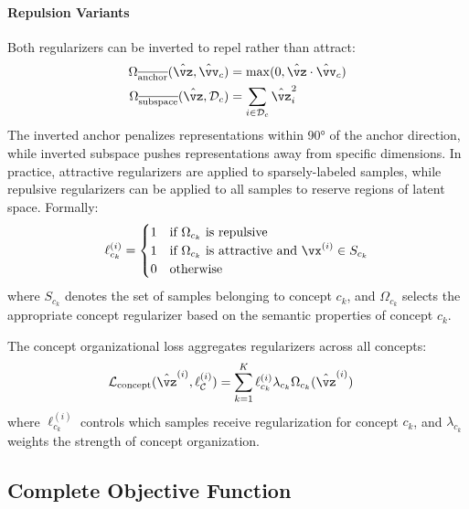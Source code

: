 \paragraph{Repulsion Variants}
Both regularizers can be inverted to repel rather than attract:
\begin{align}
    \Omega_{\overline{\text{anchor}}}(\hat{\vz}, \hat{\vv}_c) &= \max(0, \hat{\vz} \cdot \hat{\vv}_c) \label{eq:anti_anchor}\\
    \Omega_{\overline{\text{subspace}}}(\hat{\vz}, \mathcal{D}_c) &= \sum_{i \in \mathcal{D}_c} \hat{\vz}_i^2 \label{eq:anti_subspace}
\end{align}
The inverted anchor penalizes representations within 90° of the anchor direction, while inverted subspace pushes representations away from specific dimensions. In practice, attractive regularizers are applied to sparsely-labeled samples, while repulsive regularizers can be applied to all samples to reserve regions of latent space. Formally:
\begin{equation}
    \ell_{c_k}^{(i)} =
    \begin{cases}
        1 & \text{if } \Omega_{c_k} \text{ is repulsive} \\
        1 & \text{if } \Omega_{c_k} \text{ is attractive and } \vx^{(i)} \in S_{c_k} \\
        0 & \text{otherwise}
    \end{cases} \label{eq:label_application}
\end{equation}
where $S_{c_k}$ denotes the set of samples belonging to concept $c_k$, and $\Omega_{c_k}$ selects the appropriate concept regularizer based on the semantic properties of concept $c_k$.

The concept organizational loss aggregates regularizers across all concepts:
\begin{align}
    \mathcal{L}_{\text{concept}}(\hat{\vz}^{(i)}, \ell^{(i)}_{\mathcal{C}}) &= \sum_{k=1}^K \ell^{(i)}_{c_k} \lambda_{c_k} \Omega_{c_k}(\hat{\vz}^{(i)}) \label{eq:multi_concept}
\end{align}
where $\ell^{(i)}_{c_k}$ controls which samples receive regularization for concept $c_k$, and $\lambda_{c_k}$ weights the strength of concept organization.

%

\subsection{Complete Objective Function}

